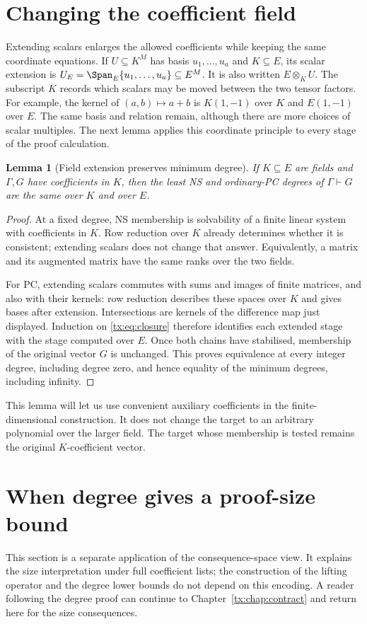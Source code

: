 \documentclass[11pt,a4paper,oneside,openany]{book}
\newtheorem{lemma}[theorem]{Lemma}
\theoremstyle{definition}\newtheorem{definition}[theorem]{Definition}
\theoremstyle{remark}\newtheorem{remark}[theorem]{Remark}
\numberwithin{equation}{chapter}
\begin{document}
\section{Changing the coefficient field}
Extending scalars enlarges the allowed coefficients while keeping the
same coordinate equations. If $U\subseteq K^M$ has basis
$u_1,\ldots,u_a$ and $K\subseteq E$, its scalar extension is
$U_E=\Span_E\{u_1,\ldots,u_a\}\subseteq E^M$.
It is also written $E\otimes_K U$. The subscript $K$ records which
scalars may be moved between the two tensor factors.
For example, the kernel of $(a,b)\mapsto a+b$ is $K(1,-1)$ over
$K$ and $E(1,-1)$ over $E$. The same basis and relation remain,
although there are more choices of scalar multiples.
The next lemma applies this coordinate principle to every stage
of the proof calculation.

\begin{lemma}[Field extension preserves minimum degree]\label{tx:lem:field}
If $K\subseteq E$ are fields and $\Gamma,G$ have coefficients in $K$,
then the least NS and ordinary-PC degrees of $\Gamma\vdash G$ are the
same over $K$ and over $E$.
\end{lemma}
\begin{proof}
At a fixed degree, NS membership is solvability of a finite linear
system with coefficients in $K$. Row reduction over $K$ already
determines whether it is consistent; extending scalars does not change
that answer. Equivalently, a matrix and its augmented matrix have the
same ranks over the two fields.

For PC, extending scalars commutes with sums and images of finite
matrices, and also with their kernels: row reduction describes these
spaces over $K$ and gives bases after extension. Intersections are
kernels of the difference map just displayed. Induction on
\eqref{tx:eq:closure} therefore identifies each extended stage with the
stage computed over $E$. Once both chains have stabilised, membership
of the original vector $G$ is unchanged. This proves equivalence at
every integer degree, including degree zero, and hence equality of
the minimum degrees, including infinity.
\end{proof}

This lemma will let us use convenient auxiliary coefficients in the
finite-dimensional construction. It does not change the target to an
arbitrary polynomial over the larger field. The target whose membership
is tested remains the original $K$-coefficient vector.

\section{When degree gives a proof-size bound}
This section is a separate application of the consequence-space view.
It explains the size interpretation under full coefficient lists; the
construction of the lifting operator and the degree lower bounds do
not depend on this encoding. A reader following the degree proof can
continue to Chapter~\ref{tx:chap:contract} and return here for the size
consequences.
\end{document}
